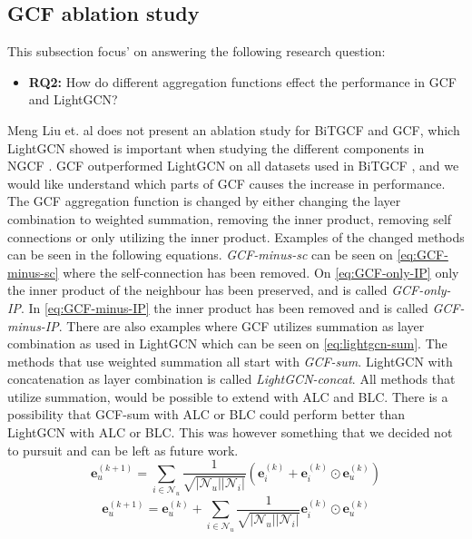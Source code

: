 \subsection{GCF ablation study}\label{subsec:gcf-ablation-study}
This subsection focus' on answering the following research question:
\begin{itemize}
    \item \textbf{RQ2:} How do different aggregation functions effect the performance in GCF and LightGCN?
\end{itemize}
Meng Liu et. al does not present an ablation study for BiTGCF and GCF, which LightGCN showed is important when studying the different components in NGCF \cite{lightgcn,BiTGCF}.
GCF outperformed LightGCN on all datasets used in BiTGCF \cite{BiTGCF}, and we would like understand which parts of GCF causes the increase in performance.
The GCF aggregation function is changed by either changing the layer combination to weighted summation, removing the inner product, removing self connections or only utilizing the inner product.
Examples of the changed methods can be seen in the following equations.
\textit{GCF-minus-sc} can be seen on \autoref{eq:GCF-minus-sc} where the self-connection has been removed.
On \autoref{eq:GCF-only-IP} only the inner product of the neighbour has been preserved, and is called \textit{GCF-only-IP}.
In \autoref{eq:GCF-minus-IP} the inner product has been removed and is called \textit{GCF-minus-IP}.
There are also examples where GCF utilizes summation as layer combination as used in LightGCN which can be seen on \autoref{eq:lightgcn-sum}.
The methods that use weighted summation all start with \textit{GCF-sum}.
LightGCN with concatenation as layer combination is called \textit{LightGCN-concat}.
All methods that utilize summation, would be possible to extend with ALC and BLC.
There is a possibility that GCF-sum with ALC or BLC could perform better than LightGCN with ALC or BLC.
This was however something that we decided not to pursuit and can be left as future work.
\begin{equation}
    \mathbf{e}_{u}^{(k+1)} = \sum^{}_{i \in \mathcal{N}_u}  \frac{1}{\sqrt{|\mathcal{N}_u||\mathcal{N}_i|}}\left( \mathbf{e}_i^{(k)} + \mathbf{e}_i^{(k)} \odot \mathbf{e}_u^{(k)} \right)
    \label{eq:GCF-minus-sc}
\end{equation}
\begin{equation}
    \mathbf{e}_{u}^{(k+1)} = \mathbf{e}_{u}^{(k)} + \sum^{}_{i \in \mathcal{N}_u}  \frac{1}{\sqrt{|\mathcal{N}_u||\mathcal{N}_i|}} \mathbf{e}_i^{(k)} \odot \mathbf{e}_u^{(k)}
    \label{eq:GCF-only-IP}
\end{equation}

